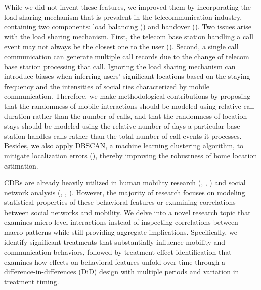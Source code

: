 While we did not invent these features, we improved them by incorporating the load sharing mechanism that is prevalent in the telecommunication industry, containing two components: load balancing (\cite{ayesha2019user}) and handover (\cite{marquez2011overview}).
Two issues arise with the load sharing mechanism.
First, the telecom base station handling a call event may not always be the closest one to the user (\cite{yuan2012correlating}).
Second, a single call communication can generate multiple call records due to the change of telecom base station processing that call.
Ignoring the load sharing mechanism can introduce biases when inferring users' significant locations based on the staying frequency and the intensities of social ties characterized by mobile communication.
Therefore, we make methodological contributions by proposing that the randomness of mobile interactions should be modeled using relative call duration rather than the number of calls, and that the randomness of location stays should be modeled using the relative number of days a particular base station handles calls rather than the total number of call events it processes.
Besides, we also apply DBSCAN, a machine learning clustering algorithm, to mitigate localization errors (\cite{ayesha2019user}), thereby improving the robustness of home location estimation.

CDRs are already heavily utilized in human mobility research (\cite{gonzalez2008understanding}, \cite{song2010limits}, \cite{wesolowski2016connecting}) and social network analysis (\cite{onnela2007structure}, \cite{cho2011friendship}, \cite{referral_effect_2023aer}).
However, the majority of research focuses on modeling statistical properties of these behavioral features or examining correlations between social networks and mobility.
We delve into a novel research topic that examines micro-level interactions instead of inspecting correlations between macro patterns while still providing aggregate implications. Specifically, we identify significant treatments that substantially influence mobility and communication behaviors, followed by treatment effect identification that examines how effects on behavioral features unfold over time through a difference-in-differences (DiD) design with multiple periods and variation in treatment timing.

